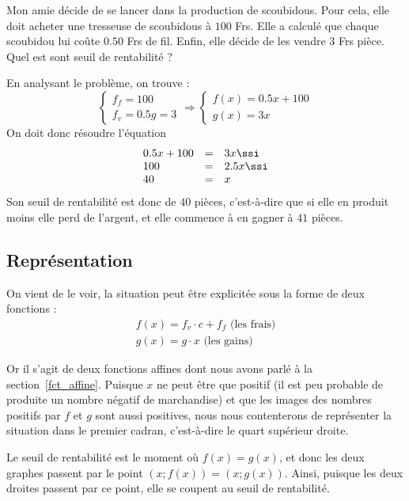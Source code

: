 \begin{exemple}\label{ex_seuil}
Mon amie décide de se lancer dans la production de scoubidous. Pour cela, elle doit acheter une tresseuse de scoubidous à $100$ Frs. Elle a calculé que chaque scoubidou lui coûte $0.50$ Frs de fil. Enfin, elle décide de les vendre $3$ Frs pièce. Quel est sont seuil de rentabilité ?

En analysant le problème, on trouve :
$$
\left\{
\begin{array}{l}
f_f = 100\\
f_v = 0.5
g = 3
\end{array}
\right.
\Rightarrow
\left\{
\begin{array}{l}
f(x) = 0.5 x + 100\\
g(x) = 3x
\end{array}
\right.
$$
On doit donc résoudre l'équation
$$
\begin{array}{lcl}
0.5 x + 100 &=& 3x \ssi \\
100 &=& 2.5 x \ssi \\
40 &=& x
\end{array}
$$
Son seuil de rentabilité est donc de $40$ pièces, c'est-à-dire que si elle en produit moins elle perd de l'argent, et elle commence à en gagner à $41$ pièces.
\end{exemple}

\subsection{Représentation}

On vient de le voir, la situation peut être explicitée sous la forme de deux fonctions :
$$
\begin{array}{l}
f(x) = f_v \cdot c + f_f \mbox{ (les frais)}\\
g(x) = g\cdot x \mbox{ (les gains)}
\end{array}
$$

Or il s'agit de deux fonctions affines dont nous avons parlé à la section~\ref{fct_affine}. Puisque $x$ ne peut être que positif (il est peu probable de produite un nombre négatif de marchandise) et que les images des nombres positifs par $f$ et $g$ sont aussi positives, nous nous contenterons de représenter la situation dans le premier cadran, c'est-à-dire le quart supérieur droite.

Le seuil de rentabilité est le moment où $f(x) = g(x)$, et donc les deux graphes passent par le point $\left(x;f(x)\right) = \left(x;g(x)\right)$. Ainsi, puisque les deux droites passent par ce point, elle se coupent au seuil de rentabilité.

